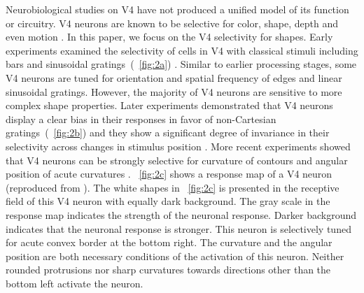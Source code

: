 \documentclass[5p]{elsarticle}
\begin{document}
Neurobiological studies on V4 have not produced a unified model of its function or circuitry.
V4 neurons are known to be selective for color, shape, depth and even motion \cite{roe2012}.
In this paper, we focus on the V4 selectivity for shapes. 
Early experiments examined the selectivity of cells in V4 
with classical stimuli including bars and sinusoidal gratings~(\figurename~\ref{fig:2a}) \cite{desimone1987}.
Similar to earlier processing stages, some V4 neurons are tuned for orientation 
and spatial frequency of edges and linear sinusoidal gratings.
However, the majority of V4 neurons are sensitive to more complex shape properties. 
Later experiments demonstrated that V4 neurons display a clear bias in their responses 
in favor of non-Cartesian gratings~(\figurename~\ref{fig:2b}) and they show a significant degree of invariance 
in their selectivity across changes in stimulus position \cite{gallant1996}.
More recent experiments showed that V4 neurons can be strongly selective for curvature
of contours and angular position of acute curvatures \cite{pasupathy1999,pasupathy2001}. 
\figurename~\ref{fig:2c} shows a response map of a V4 neuron
(reproduced from \cite{pasupathy2001}).
The white shapes in \figurename~\ref{fig:2c} is presented in the receptive field of this V4 neuron
with equally dark background. 
The gray scale in the response map indicates the strength of the neuronal response.
Darker background indicates that the neuronal response is stronger.
This neuron is selectively tuned for acute convex border at the bottom right.
The curvature and the angular position are both necessary conditions of the activation of this neuron.
Neither rounded protrusions nor sharp curvatures towards directions other than the bottom left
activate the neuron.
\end{document}
